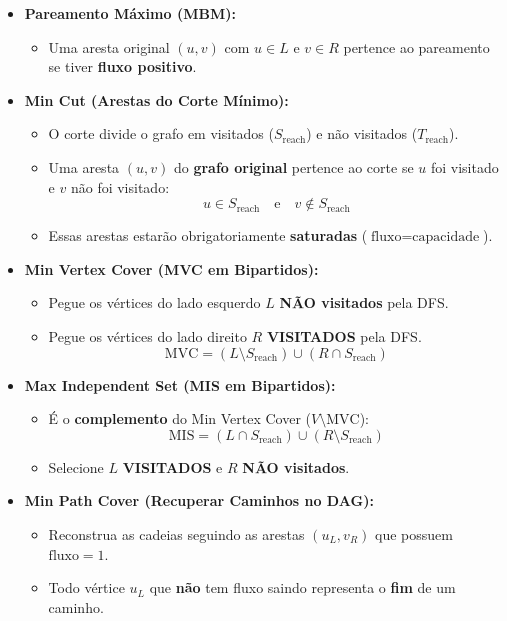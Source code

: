 \begin{itemize}
    \item \textbf{Pareamento Máximo (MBM):}
    \begin{itemize}
        \item Uma aresta original $(u, v)$ com $u \in L$ e $v \in R$ pertence ao pareamento se tiver \textbf{fluxo positivo}.
    \end{itemize}

    \item \textbf{Min Cut (Arestas do Corte Mínimo):}
    \begin{itemize}
        \item O corte divide o grafo em visitados ($S_{\text{reach}}$) e não visitados ($T_{\text{reach}}$).
        \item Uma aresta $(u, v)$ do \textbf{grafo original} pertence ao corte se $u$ foi visitado e $v$ não foi visitado:
        \[ u \in S_{\text{reach}} \quad \text{e} \quad v \notin S_{\text{reach}} \]
        \item Essas arestas estarão obrigatoriamente \textbf{saturadas} ($\text{fluxo} = \text{capacidade}$).
    \end{itemize}

    \item \textbf{Min Vertex Cover (MVC em Bipartidos):}
    \begin{itemize}
        \item Pegue os vértices do lado esquerdo $L$ \textbf{NÃO visitados} pela DFS.
        \item Pegue os vértices do lado direito $R$ \textbf{VISITADOS} pela DFS.
        \[ \text{MVC} = (L \setminus S_{\text{reach}}) \cup (R \cap S_{\text{reach}}) \]
    \end{itemize}

    \item \textbf{Max Independent Set (MIS em Bipartidos):}
    \begin{itemize}
        \item É o \textbf{complemento} do Min Vertex Cover ($V \setminus \text{MVC}$):
        \[ \text{MIS} = (L \cap S_{\text{reach}}) \cup (R \setminus S_{\text{reach}}) \]
        \item Selecione $L$ \textbf{VISITADOS} e $R$ \textbf{NÃO visitados}.
    \end{itemize}

    \item \textbf{Min Path Cover (Recuperar Caminhos no DAG):}
    \begin{itemize}
        \item Reconstrua as cadeias seguindo as arestas $(u_L, v_R)$ que possuem $\text{fluxo} = 1$.
        \item Todo vértice $u_L$ que \textbf{não} tem fluxo saindo representa o \textbf{fim} de um caminho.
    \end{itemize}
\end{itemize}

